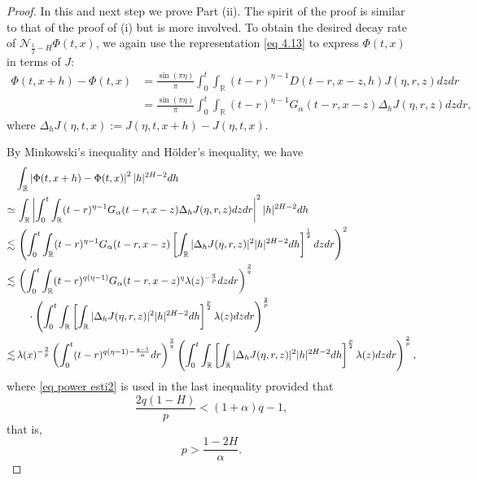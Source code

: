 \documentclass[11pt,reqno]{amsart}
\numberwithin{equation}{section}
\newcommand{\1}{{\bf 1}}
\newcommand{\2}{{\bf 2}}
\begin{document}
\begin{proof}
 In this and next step we prove Part (ii). The spirit of the proof is similar to that of the proof of (i) but is more
involved. To obtain the desired decay rate of $\mathcal{N}_{\frac12-H}\Phi(t,x)$, we again  use the representation \eqref{eq 4.13} to express $\Phi(t,x)$ in terms of  $J$:
\begin{equation*}
\begin{split}
\Phi(t,x+h)-\Phi(t,x)&=\frac{\sin(\pi \eta)}{\pi}\int_0^{t}\int_{\mathbb{R}}(t-r)^{\eta-1}D(t-r,x-z,h)J(\eta,r,z)dzdr\\
&=\frac{\sin(\pi \eta)}{\pi}\int_0^{t}\int_{\mathbb{R}}(t-r)^{\eta-1}G_{\alpha}(t-r,x-z)\Delta_{h}J(\eta,r,z)dzdr,
\end{split}\end{equation*}
where  $\Delta_{h}J(\eta, t,x):=J(\eta,t,x+h)-J(\eta,t,x)$.


By Minkowski's inequality and  H\"older's inequality, we have
\begin{align*}
&\int_{\mathbb{R}} \left|\Phi(t,x+h)-\Phi(t,x)\right|^2|h|^{2H-2}dh\\
 \simeq &\, \int_{\mathbb{R}}\left|\int_0^{t}\int_{\mathbb{R}}(t-r)^{\eta-1}G_{\alpha}(t-r,x-z)\Delta_{h}J(\eta,r,z)dzdr\right|^2|h|^{2H-2}dh\\
 \lesssim &\,\left( \int_0^t\int_{\mathbb{R}}(t-r)^{\eta-1}G_{\alpha}(t-r,x-z)\left[\int_{\mathbb{R}}|\Delta_{h}J(\eta,r,z)|^2|h|^{2H-2}dh\right]^{\frac12}  dzdr\right)^2\\
 \lesssim &\,\left( \int_0^t\int_{\mathbb{R}}(t-r)^{q(\eta-1)}G_{\alpha}(t-r,x-z)^q\lambda(z)^{-\frac{q}{p}}dzdr\right)^{\frac2q}\\
&\hskip 12pt\cdot \left( \int_0^t\int_{\mathbb{R}}\left[\int_{\mathbb{R}}|\Delta_{h}J(\eta,r,z)|^2|h|^{2H-2}dh\right]^{\frac{p}2}\lambda(z)dzdr \right)^{\frac2p}\\
 \lesssim &\, \lambda(x)^{-\frac2p}\left(\int_0^t(t-r)^{q(\eta-1)-\frac{q-1}{\alpha}}dr\right)^{\frac2q} \left( \int_0^t\int_{\mathbb{R}}\left[\int_{\mathbb{R}}|\Delta_{h}J(\eta,r,z)|^2|h|^{2H-2}dh\right]^{\frac{p}2}\lambda(z)dzdr \right)^{\frac2p},
\end{align*}
where    \eqref{eq power esti2} is used in the last inequality provided that 
$$\frac{2q(1-H)}{p}<(1+\alpha)q-1,$$
that is, 
 \begin{equation}
    \label{eq p condi3}p>\frac{1-2H}{\alpha}.
    \end{equation}


\end{proof}
\end{document}
